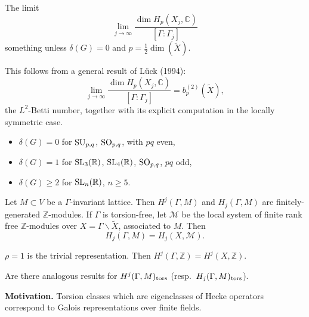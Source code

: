 \documentclass[reqno]{amsart} 
\begin{document}
\begin{theorem}
  The limit
  \begin{equation*}
    \lim_{j \rightarrow \infty }
    \frac{\dim H_p (X_j, \mathbb{C} )}{ [\Gamma : \Gamma_j ]}
  \end{equation*}
  something unless $\delta (G) =0 $ and $p = \frac{1}{2} \dim (\tilde{X})$.
\end{theorem}
This follows from a general result of L{\"u}ck (1994):
\begin{equation*}
  \lim_{j \rightarrow \infty }
  \frac{\dim H_p (X_j , \mathbb{C} )}{ [\Gamma : \Gamma_j ]}
  = b_p^{(2)} (\tilde{X}),
\end{equation*}
the $L^2$-Betti number, together with its explicit computation in the locally symmetric case.

\begin{example}
\begin{itemize}
\item $\delta (G) = 0$ for $\operatorname{SU}_{p, q}$, $\operatorname{SO}_{p, q}$, with $p q$ even,
\item $\delta (G) = 1$ for $\operatorname{SL}_3 (\mathbb{R})$, $\operatorname{SL}_4 (\mathbb{R})$, $\operatorname{SO}_{p, q}$, $p q $ odd,
\item $\delta (G) \geq 2$ for $\operatorname{SL}_n (\mathbb{R})$, $n \geq 5$.
\end{itemize}
\end{example}

Let $M \subset V$ be a $\Gamma$-invariant lattice.  Then $H^j (\Gamma, M)$ and $H_j (\Gamma, M)$ are finitely-generated $\mathbb{Z}$-modules.  If $\Gamma $ is torsion-free, let $\mathcal{M} $ be the local system of finite rank free $\mathbb{Z}$-modules over $X = \Gamma \backslash \tilde{X}$, associated to $M$.  Then
\begin{equation*}
H_j (\Gamma, M) = H_j (X, \mathcal{M}).
\end{equation*}
\begin{example}
$\rho = 1$ is the trivial representation.  Then $H^j (\Gamma, \mathbb{Z}) = H^j (X, \mathbb{Z})$.
\end{example}
\begin{question}
Are there analogous results for $H^j (\Gamma, M)_{\operatorname{tors}}$ (resp.\ $H_j (\Gamma, M)_{\operatorname{tors}}$).
\end{question}
\textbf{Motivation.}  Torsion classes which are eigenclasses of Hecke operators correspond to Galois representations over finite fields.
\end{document}

